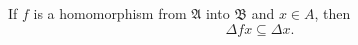 If $f$ is a homomorphism from $\mathfrak{A}$ into $\mathfrak{B}$ and $x \in A$, then
$$\Delta fx \subseteq \Delta x.$$
